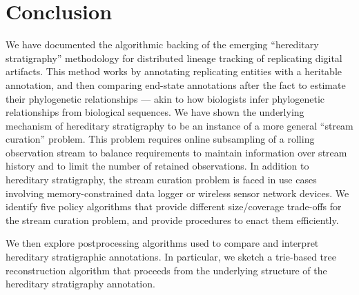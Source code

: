 \section{Conclusion} \label{sec:conclusion}

We have documented the algorithmic backing of the emerging ``hereditary stratigraphy'' methodology for distributed lineage tracking of replicating digital artifacts.
This method works by annotating replicating entities with a heritable annotation, and then comparing end-state annotations after the fact to estimate their phylogenetic relationships --- akin to how biologists infer phylogenetic relationships from biological sequences.
We have shown the underlying mechanism of hereditary stratigraphy to be an instance of a more general ``stream curation'' problem.
This problem requires online subsampling of a rolling observation stream to balance requirements to maintain information over stream history and to limit the number of retained observations.
In addition to hereditary stratigraphy, the stream curation problem is faced in use cases involving memory-constrained data logger or wireless sensor network devices.
We identify five policy algorithms that provide different size/coverage trade-offs for the stream curation problem, and provide procedures to enact them efficiently.

We then explore postprocessing algorithms used to compare and interpret hereditary stratigraphic annotations.
In particular, we sketch a trie-based tree reconstruction algorithm that proceeds from the underlying structure of the hereditary stratigraphy annotation.

